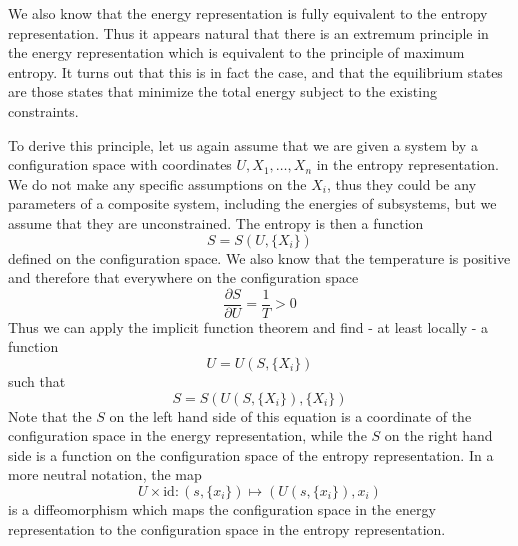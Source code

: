 \documentclass[a4paper, draft]{report}
\numberwithin{section}{chapter}
\numberwithin{equation}{chapter}
\theoremstyle{own}
\theoremstyle{remark}
\begin{document}
We also know that the energy representation is fully equivalent to the entropy representation. Thus it appears natural that there is an extremum principle in the energy representation which is equivalent to the principle of maximum entropy. It turns out that this is in fact the case, and that the equilibrium states are those states that minimize the total energy subject to the existing constraints.

To derive this principle, let us again assume that we are given a system by a configuration space with coordinates $U, X_1, \dots, X_n$ in the entropy representation. We do not make any specific assumptions on the $X_i$, thus they could be any parameters of a composite system, including the energies of subsystems, but we assume that they are unconstrained. The entropy is then a function
$$
S = S(U, \{ X_i \})
$$
defined on the configuration space. We also know that the temperature is positive and therefore that everywhere on the configuration space
$$
\frac{\partial S}{\partial U} = \frac{1}{T} > 0
$$
Thus we can apply the implicit function theorem and find - at least locally - a function 
$$
U = U(S, \{ X_i \})
$$
such that
$$
S = S(U(S,\{ X_i \}), \{ X_i \})
$$
Note that the $S$ on the left hand side of this equation is a coordinate of the configuration space in the energy representation, while the $S$ on the right hand side is a function on the configuration space of the entropy representation. In a more neutral notation, the map
$$
U \times \text{id} \colon (s,\{ x_i \} ) \mapsto (U(s, \{ x_i \}), x_i)
$$
is a diffeomorphism which maps the configuration space in the energy representation to the configuration space in the entropy representation.
\end{document}
